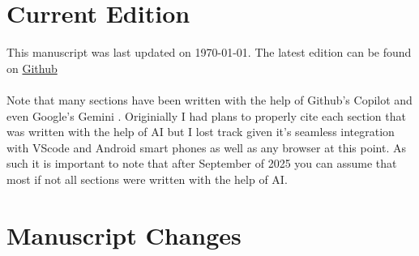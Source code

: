 
\section*{}

\section*{Current Edition}

This manuscript was last updated on \today. 
The latest edition can be found on \href{https://github.com/cmontalvo251/LaTeX/blob/master/Aerospace_Mechanics/aerospace_mechanics.pdf}{Github}
\ \\
\ \\
 Note that many sections have been written with the help of
Github's Copilot \cite{GithubCopilot} and even Google's Gemini \cite{Gemini}. Originially I had plans to properly cite each section that was written with the help of AI but I lost track given it's seamless integration with VScode and Android smart phones as well as any browser at this point. As such it is important to note that after September of 2025 you can assume that most if not all sections were written with the help of AI.

\section*{Manuscript Changes}

